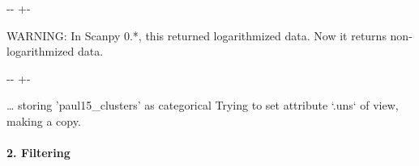 \documentclass[letterpaper,10pt,english]{sphinxmanual}
\newlength\nbsphinxcodecellspacing
\begin{document}
{

\kern-\sphinxverbatimsmallskipamount\kern-\baselineskip
\kern+\FrameHeightAdjust\kern-\fboxrule
\vspace{\nbsphinxcodecellspacing}

\begin{sphinxVerbatim}[commandchars=\\\{\}]
WARNING: In Scanpy 0.*, this returned logarithmized data. Now it returns non-logarithmized data.
\end{sphinxVerbatim}
}

{

\kern-\sphinxverbatimsmallskipamount\kern-\baselineskip
\kern+\FrameHeightAdjust\kern-\fboxrule
\vspace{\nbsphinxcodecellspacing}

\begin{sphinxVerbatim}[commandchars=\\\{\}]
{\ldots} storing 'paul15\_clusters' as categorical
Trying to set attribute `.uns` of view, making a copy.
\end{sphinxVerbatim}
}


\paragraph{2. Filtering}
\label{\detokenize{notebooks/03_scRNA-seq_data_preprocessing/scanpy_preprocessing_with_Paul_etal_2015_data:2.-Filtering}}
{
\begin{sphinxVerbatim}[commandchars=\\\{\}]
\llap{\color{nbsphinxin}[4]:\,\hspace{\fboxrule}\hspace{\fboxsep}}
 

\end{sphinxVerbatim}
}
\end{document}
